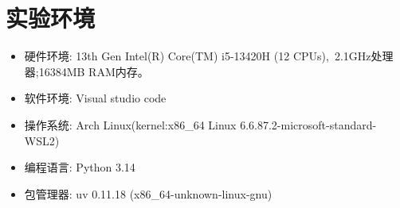 \section{实验环境}
\begin{itemize}
    \item 硬件环境: 13th Gen Intel(R) Core(TM) i5-13420H (12 CPUs),~2.1GHz处理器;16384MB RAM内存。
    \item 软件环境: Visual studio code
    \item 操作系统: Arch Linux(kernel:x86\_64 Linux 6.6.87.2-microsoft-standard-WSL2)
    \item 编程语言: Python 3.14
    \item 包管理器: uv 0.11.18 (x86\_64-unknown-linux-gnu)
\end{itemize}
